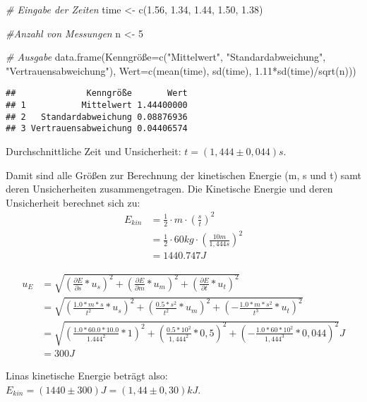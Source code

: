 \documentclass[
]{article}
\newenvironment{Shaded}{\begin{snugshade}}{\end{snugshade}}
\newcommand{\AttributeTok}[1]{\textcolor[rgb]{0.77,0.63,0.00}{#1}}
\newcommand{\CommentTok}[1]{\textcolor[rgb]{0.56,0.35,0.01}{\textit{#1}}}
\newcommand{\DecValTok}[1]{\textcolor[rgb]{0.00,0.00,0.81}{#1}}
\newcommand{\FloatTok}[1]{\textcolor[rgb]{0.00,0.00,0.81}{#1}}
\newcommand{\FunctionTok}[1]{\textcolor[rgb]{0.00,0.00,0.00}{#1}}
\newcommand{\NormalTok}[1]{#1}
\newcommand{\OtherTok}[1]{\textcolor[rgb]{0.56,0.35,0.01}{#1}}
\newcommand{\SpecialCharTok}[1]{\textcolor[rgb]{0.00,0.00,0.00}{#1}}
\newcommand{\StringTok}[1]{\textcolor[rgb]{0.31,0.60,0.02}{#1}}
\begin{document}
\begin{Shaded}
\begin{Highlighting}[]
\CommentTok{\# Eingabe der Zeiten}
\NormalTok{time }\OtherTok{\textless{}{-}} \FunctionTok{c}\NormalTok{(}\FloatTok{1.56}\NormalTok{, }\FloatTok{1.34}\NormalTok{, }\FloatTok{1.44}\NormalTok{, }\FloatTok{1.50}\NormalTok{, }\FloatTok{1.38}\NormalTok{)}

\CommentTok{\#Anzahl von Messungen}
\NormalTok{n }\OtherTok{\textless{}{-}} \DecValTok{5}

\CommentTok{\# Ausgabe}
\FunctionTok{data.frame}\NormalTok{(Kenngröße}\OtherTok{=}\FunctionTok{c}\NormalTok{(}\StringTok{"Mittelwert"}\NormalTok{, }
                       \StringTok{"Standardabweichung"}\NormalTok{, }
                       \StringTok{"Vertrauensabweichung"}\NormalTok{), }
           \AttributeTok{Wert=}\FunctionTok{c}\NormalTok{(}\FunctionTok{mean}\NormalTok{(time), }\FunctionTok{sd}\NormalTok{(time), }\FloatTok{1.11}\SpecialCharTok{*}\FunctionTok{sd}\NormalTok{(time)}\SpecialCharTok{/}\FunctionTok{sqrt}\NormalTok{(n)))}
\end{Highlighting}
\end{Shaded}

\begin{verbatim}
##              Kenngröße       Wert
## 1           Mittelwert 1.44400000
## 2   Standardabweichung 0.08876936
## 3 Vertrauensabweichung 0.04406574
\end{verbatim}

Durchschnittliche Zeit und Unsicherheit: \(t=(1,444\pm 0,044)s\).

Damit sind alle Größen zur Berechnung der kinetischen Energie (m, s und
t) samt deren Unsicherheiten zusammengetragen. Die Kinetische Energie
und deren Unsicherheit berechnet sich zu: \begin{align*}
E_{kin} &= \frac{1}{2}\cdot m\cdot (\frac{s}{t})^2\\
& = \frac{1}{2}\cdot 60kg\cdot (\frac{10m}{1,444s})^2\\
&=1440.747J
\end{align*}

\begin{align*}
u_{E} &= \sqrt{(\frac{\partial E}{\partial s}*u_{s})^2+(\frac{\partial E}{\partial m}*u_{m})^2+(\frac{\partial E}{\partial t}*u_{t})^2}\\
 &= \sqrt{(\frac{1.0*m*s}{t^{2}}*u_{s})^2+(\frac{0.5*s^{2}}{t^{2}}*u_{m})^2+(-\frac{1.0*m*s^{2}}{t^{3}}*u_{t})^2}\\
 &= \sqrt{(\frac{1.0*60.0*10.0}{1.444^{2}}*1)^2+(\frac{0.5*10^{2}}{1,444^{2}}*0,5)^2+(-\frac{1.0*60*10^{2}}{1,444^{3}}*0,044)^2}J\\
 &=300J
\end{align*}

Linas kinetische Energie beträgt also:
\(E_{kin}=(1440 \pm 300)J = (1,44\pm0,30)kJ\).
\end{document}
